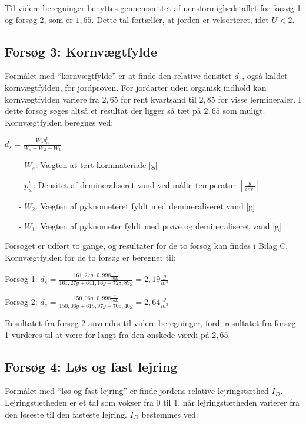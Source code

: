 Til videre beregninger benyttes gennemsnittet af uensformighedstallet for forsøg 1 og forsøg 2, som er $1,\!65$. Dette tal fortæller, at jorden er velsorteret, idet $U<2$. 

\subsection{Forsøg 3: Kornvægtfylde}
Formålet med “kornvægtfylde” er at finde den relative densitet $d_s$, også kaldet kornvægtfylden, for jordprøven. For jordarter uden organisk indhold kan kornvægtfylden variere fra $2,\!65$ for rent kvartsand til $2,\!85$ for visse lermineraler. I dette forsøg søges altså et resultat der ligger så tæt på $2,\!65$ som muligt.
\newline
\newline
Kornvægtfylden beregnes ved:

\begin{center}
	$d_s = \frac{W_s p_w^t}{W_s + W_2 - W_1}$
\end{center}

\begin{itemize}
	\item[-] $W_s$: Vægten at tørt kornmateriale [g]
	\item[-] $p_w^t$: Densitet af demineraliseret vand ved målte temperatur $[\frac{g}{cm^3}]$
	\item[-] $W_2$: Vægten af pyknometeret fyldt med demineraliseret vand [g]
	\item[-] $W_1$: Vægten af pyknometer fyldt med prøve og demineraliseret vand [g]
\end{itemize}

Forsøget er udført to gange, og resultater for de to forsøg kan findes i Bilag C. Kornvægtfylden for de to forsøg er beregnet til:

\begin{center}
	Forsøg 1: $d_{s} = \frac{161,\!27 g \cdot 0,\!998 \frac{g}{mL}}{161,\!27 g + 641,\!16 g - 728,\!89 g} = 2,\!19 \frac{g}{m^3}$
\end{center}
\begin{center}
	Forsøg 2: $d_{s} = \frac{150,\!06 g \cdot 0,\!998 \frac{g}{mL}}{150,\!06 g + 615,\!97 g - 709,\!40 g} = 2,\!64 \frac{g}{m^3}$
\end{center} 

Resultatet fra forsøg 2 anvendes til videre beregninger, fordi resultatet fra forsøg 1 vurderes til at være for langt fra den ønskede værdi på $2,\!65$.

\subsection{Forsøg 4: Løs og fast lejring}
Formålet med “løs og fast lejring” er finde jordens relative lejringstæthed $I_D$. Lejringstætheden er et tal som vokser fra 0 til 1, når lejringstætheden varierer fra den løseste til den fasteste lejring.
\newline
\newline
$I_D$ bestemmes ved:

